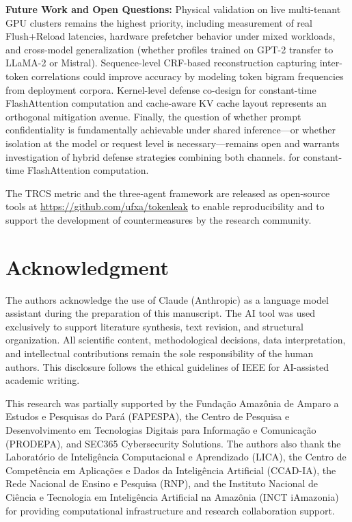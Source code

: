 \documentclass[conference,10pt,twocolumn]{IEEEtran}
\begin{document}
\textbf{Future Work and Open Questions:}
Physical validation on live multi-tenant GPU clusters remains the highest priority, including measurement of real Flush+Reload latencies, hardware prefetcher behavior under mixed workloads, and cross-model generalization (whether profiles trained on GPT-2 transfer to LLaMA-2 or Mistral). Sequence-level CRF-based reconstruction capturing inter-token correlations could improve accuracy by modeling token bigram frequencies from deployment corpora. Kernel-level defense co-design for constant-time FlashAttention computation and cache-aware KV cache layout represents an orthogonal mitigation avenue. Finally, the question of whether prompt confidentiality is fundamentally achievable under shared inference—or whether isolation at the model or request level is necessary—remains open and warrants investigation of hybrid defense strategies combining both channels.
for constant-time FlashAttention computation.

The TRCS metric and the three-agent framework are released
as open-source tools at \url{https://github.com/ufxa/tokenleak}
to enable reproducibility and to support the development of
countermeasures by the research community.

\section*{Acknowledgment}

The authors acknowledge the use of Claude (Anthropic) as a language model assistant during the preparation of this manuscript. The AI tool was used exclusively to support literature synthesis, text revision, and structural organization. All scientific content, methodological decisions, data interpretation, and intellectual contributions remain the sole responsibility of the human authors. This disclosure follows the ethical guidelines of IEEE for AI-assisted academic writing.

\smallskip

This research was partially supported by the Fundação Amazônia de Amparo a Estudos e Pesquisas do Pará (FAPESPA), the Centro de Pesquisa e Desenvolvimento em Tecnologias Digitais para Informação e Comunicação (PRODEPA), and SEC365 Cybersecurity Solutions. The authors also thank the Laboratório de Inteligência Computacional e Aprendizado (LICA), the Centro de Competência em Aplicações e Dados da Inteligência Artificial (CCAD-IA), the Rede Nacional de Ensino e Pesquisa (RNP), and the Instituto Nacional de Ciência e Tecnologia em Inteligência Artificial na Amazônia (INCT iAmazonia) for providing computational infrastructure and research collaboration support.
\end{document}
